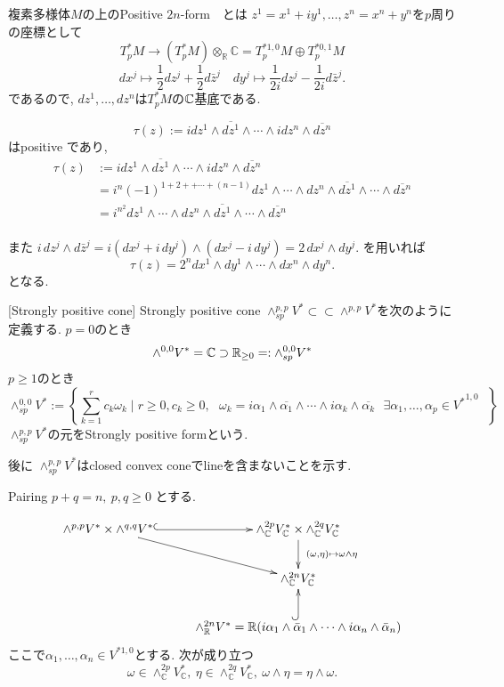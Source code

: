 複素多様体$M$の上のPositive $2n$-form　とは
$z^1=x^1+ iy^1, \ldots, z^n=x^n + y^n$を$p$周りの座標として
\[
T_p^*M
\longrightarrow
(T_p^*M)\otimes_{\mathbb{R}}\mathbb{C}
=
T_p^{*1,0}M\oplus T_p^{*0,1}M
\]
\[
dx^j
\longmapsto
\frac{1}{2}dz^j+\frac{1}{2}d\bar{z}^j
\quad
dy^j
\longmapsto
\frac{1}{2i}dz^j-\frac{1}{2i}d\bar{z}^j.
\]
であるので, $dz^1, \ldots, dz^n$は$T_p^*M$の$\mathbb{C}$基底である.

$$
\tau(z):=i dz^1 \wedge \overline{dz^1} \wedge \cdots \wedge i dz^n\wedge \overline{dz^n} 
$$
はpositive であり, 
\begin{align*}
\tau(z)
&:=i dz^1 \wedge \overline{dz^1} \wedge \cdots \wedge i dz^n\wedge \overline{dz^n}
\\
&=i^n (-1)^{1 + 2 + + \cdots + (n-1)}
dz^1 \wedge \cdots \wedge dz^n\wedge   \overline{dz^1} \wedge \cdots \wedge \overline{dz^n}
\\
&=i^{n^2}dz^1 \wedge \cdots \wedge dz^n  \wedge \overline{dz^1} \wedge \cdots \wedge \overline{dz^n}
\\
\end{align*}


また
\(
i\,dz^j\wedge d\bar{z}^j
=
i(dx^j+i\,dy^j)\wedge(dx^j-i\,dy^j)
=
2\,dx^j\wedge dy^j.
\)
を用いれば
\[
\tau(z)
=
2^n dx^1\wedge dy^1\wedge\cdots\wedge dx^n\wedge dy^n.
\]
となる. 



\begin{tcolorbox}[mybox]
\begin{defn}
\label{defn-M-4.4.4}[Strongly positive cone]
Strongly positive cone $\wedge_{sp}^{p,p}V^{*} \subset \subset 
\wedge^{p,p}V^{*}$を次のように定義する.
$p=0$のとき
$$
\wedge^{0,0}V^{*}=\mathbb{C} \supset \mathbb{R}_{\ge 0}=:\wedge_{sp}^{0,0}V^{*}
$$
$p \ge 1$のとき
$$
\wedge_{sp}^{0,0}V^{*}
:= \left\{ \sum_{k=1}^{r} c_k \omega_k \mid \text{$r \ge 0, c_k \ge 0,$ }
\omega_k= i \alpha_1 \wedge \overline{\alpha_1} \wedge \cdots \wedge i \alpha_k\wedge \overline{\alpha_k} \text{ $\exists \alpha_1, \ldots, \alpha_p \in {V^{*}}^{1,0} $ }
\right\}
$$
 $\wedge_{sp}^{p,p}V^{*}$の元をStrongly positive formという. 
\end{defn}
\end{tcolorbox}
後に $\wedge_{sp}^{p,p}V^{*}$はclosed convex coneでlineを含まないことを示す. 


Pairing \(p+q=n,\ p,q\ge 0\) とする.

\[
\xymatrix@C=28pt@R=22pt{
\wedge^{p,p}V^* \times \wedge^{q,q}V^*
  \ar@{^{(}->}[r]
  \ar[dr]
&
\wedge_{\mathbb C}^{2p}V_{\mathbb C}^* \times \wedge_{\mathbb C}^{2q}V_{\mathbb C}^*
  \ar[d]^-{\ (\omega,\eta)\mapsto \omega\wedge\eta\ }
\\
&
\wedge_{\mathbb C}^{2n}V_{\mathbb C}^*
  \\ 
  & 
  \wedge_{\mathbb R}^{2n}V^*
  =
  \mathbb R\!\left(
    i\alpha_1\wedge\bar{\alpha}_1\wedge\cdots\wedge i\alpha_n\wedge\bar{\alpha}_n
  \right)
    \ar@{^{(}->}[u]
}
\]
ここで$\alpha_1,\ldots,\alpha_n\in V^{*1,0}$とする. 
次が成り立つ
\[\omega\in \wedge_{\mathbb{C}}^{2p}V_{\mathbb{C}}^*,\ \eta\in \wedge_{\mathbb{C}}^{2q}V_{\mathbb{C}}^*,\ \omega\wedge\eta=\eta\wedge\omega.\]


